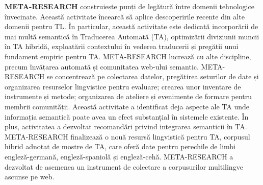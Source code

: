 \documentclass[]{../../metanetpaper}
\begin{document}
\begin{multicols}{2}
\textbf{META-RESEARCH} construiește punți de legătură între domenii tehnologice învecinate. Această activitate încearcă să aplice descoperirile recente din alte domenii pentru TL. În particular, această activitate este dedicată incorporării de mai multă semantică în Traducerea Automată (TA), optimizării diviziunii muncii în TA hibridă, exploatării contextului în vederea traducerii și pregătii unui fundament empiric pentru TA. META-RESEARCH lucrează cu alte discipline, precum învățarea automată și comunitatea web-ului semantic. META-RESEARCH se concentrează pe colectarea datelor, pregătirea seturilor de date și organizarea resurselor lingvistice pentru evaluare; crearea unor inventare de instrumente și metode; organizarea de ateliere și evenimente de formare pentru membrii comunității. Această activitate a identificat deja aspecte ale TA unde informația semantică poate avea un efect substanțial în sistemele existente. În plus, activitatea a dezvoltat recomandări privind integrarea semanticii în TA. META-RESEARCH finalizează o nouă resursă lingvistică pentru TA, corpusul hibrid adnotat de mostre de TA, care oferă date pentru perechile de limbi engleză-germană, engleză-spaniolă și engleză-cehă. META-RESEARCH a dezvoltat de asemenea un instrument de colectare a corpusurilor multilingve ascunse pe web.

\end{multicols}


\setcounter{section}{0}
\setcounter{figure}{0}

\cleardoublepage


\end{document}
